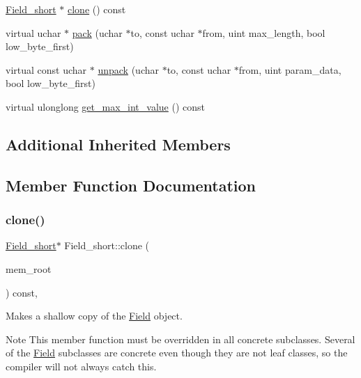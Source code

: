 \begin{DoxyCompactItemize}
\mbox{\hyperlink{classField__short}{Field\+\_\+short}} $\ast$ \mbox{\hyperlink{classField__short_a49ed5516e3c4db861a861fe07af2e651}{clone}} () const
\item 
virtual uchar $\ast$ \mbox{\hyperlink{classField__short_a53af61e2ddf7e5e25d67e1bd1ea78099}{pack}} (uchar $\ast$to, const uchar $\ast$from, uint max\+\_\+length, bool low\+\_\+byte\+\_\+first)
\item 
virtual const uchar $\ast$ \mbox{\hyperlink{classField__short_ab017d92c943d172dd8f6691e6657cf7d}{unpack}} (uchar $\ast$to, const uchar $\ast$from, uint param\+\_\+data, bool low\+\_\+byte\+\_\+first)
\item 
virtual ulonglong \mbox{\hyperlink{classField__short_a96adb2b3df54346d954ee18eb2903927}{get\+\_\+max\+\_\+int\+\_\+value}} () const
\end{DoxyCompactItemize}
\subsection*{Additional Inherited Members}


\subsection{Member Function Documentation}
\mbox{\label{classField__short_af95c6951f580be2b648c051ae9a70a3e}} 
\subsubsection{\texorpdfstring{clone()}{clone()}\hspace{0.1cm}{\footnotesize\ttfamily [1/2]}}
{\footnotesize\ttfamily \mbox{\hyperlink{classField__short}{Field\+\_\+short}}$\ast$ Field\+\_\+short\+::clone (\begin{DoxyParamCaption}\item[{M\+E\+M\+\_\+\+R\+O\+OT $\ast$}]{mem\+\_\+root }\end{DoxyParamCaption}) const\hspace{0.3cm}{\ttfamily [inline]}, {\ttfamily [virtual]}}

Makes a shallow copy of the \mbox{\hyperlink{classField}{Field}} object.

\begin{DoxyNote}{Note}
This member function must be overridden in all concrete subclasses. Several of the \mbox{\hyperlink{classField}{Field}} subclasses are concrete even though they are not leaf classes, so the compiler will not always catch this.
\end{DoxyNote}

